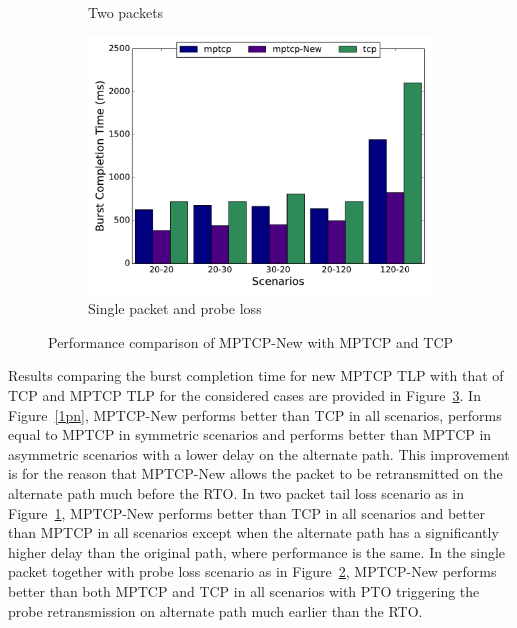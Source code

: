 \documentclass[10pt,conference]{IEEEtran}
\begin{document}
\begin{figure}[!tbp]
\begin{subfigure}[b]{0.32\textwidth}
\caption{Two packets}\label{2pn}
\end{subfigure}
\hfill
\begin{subfigure}[b]{0.32\textwidth}
\includegraphics[angle=0, width=\textwidth, natwidth=578.16,natheight=433.62]{plots/1PPNew.pdf}
\caption{Single packet and probe loss}\label{1ppn}
\end{subfigure}
\caption{Performance comparison of MPTCP-New with MPTCP and TCP}\label{mpnew}
\end{figure}

Results comparing the burst completion time for new MPTCP TLP with that of TCP and MPTCP TLP for the considered cases are provided in Figure~\ref{mpnew}. In Figure~\ref{1pn}, MPTCP-New performs better than TCP in all scenarios, performs equal to MPTCP in symmetric scenarios and performs better than MPTCP in asymmetric scenarios with a lower delay on the alternate path. This improvement is for the reason that MPTCP-New allows the packet to be retransmitted on the alternate path much before the RTO. In two packet tail loss scenario as in Figure~\ref{2pn}, MPTCP-New performs better than TCP in all scenarios and better than MPTCP in all scenarios except when the alternate path has a significantly higher delay than the original path, where performance is the same. In the single packet together with probe loss scenario as in Figure~\ref{1ppn}, MPTCP-New performs better than both MPTCP and TCP in all scenarios with PTO triggering the probe retransmission on alternate path much earlier than the RTO.




\end{document}
